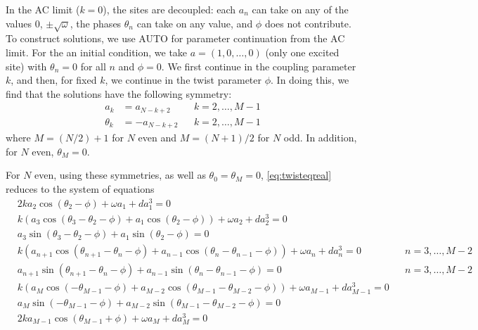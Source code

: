 \documentclass[12pt]{article}
\begin{document}
In the AC limit ($k = 0$), the sites are decoupled: each $a_n$ can take on any of the values 0, $\pm \sqrt{\omega}$, the phases $\theta_n$ can take on any value, and $\phi$ does not contribute. To construct solutions, we use AUTO for parameter continuation from the AC limit. For the an initial condition, we take $a = (1, 0, \dots, 0)$ (only one excited site) with $\theta_n = 0$ for all $n$ and $\phi = 0$. We first continue in the coupling parameter $k$, and then, for fixed $k$, we continue in the twist parameter $\phi$. In doing this, we find that the solutions have the following symmetry:
\begin{equation}
\begin{aligned}
a_k &= a_{N-k+2} && k = 2, \dots, M-1 \\
\theta_k &= -a_{N-k+2} && k = 2, \dots, M-1 
\end{aligned}
\end{equation}
where $M = (N/2)+1$ for $N$ even and $M = (N+1)/2$ for $N$ odd. In addition, for $N$ even, $\theta_M = 0$. 

For $N$ even, using these symmetries, as well as $\theta_0 = \theta_M = 0$, \cref{eq:twisteqreal} reduces to the system of equations
\begin{equation}\label{eq:twisteqeven}
\begin{aligned}
&2 k a_2 \cos(\theta_2 - \phi) + \omega a_1 + d a_1^3 = 0 \\
&k\left( a_3 \cos(\theta_3-\theta_2-\phi) + a_1 \cos(\theta_2-\phi)\right) + \omega a_2 + d a_2^3 = 0 \\
&a_3 \sin(\theta_3-\theta_2-\phi) + a_1 \sin(\theta_2-\phi) = 0 \\
&k\left( a_{n+1} \cos(\theta_{n+1}-\theta_n-\phi) + a_{n-1} \cos(\theta_n - \theta_{n-1}-\phi)\right) + \omega a_n + d a_n^3 = 0 && n = 3, \dots, M-2 \\
&a_{n+1} \sin(\theta_{n+1}-\theta_n-\phi) + a_{n-1} \sin(\theta_n - \theta_{n-1}-\phi) = 0 && n = 3, \dots, M-2 \\
&k\left( a_M \cos(-\theta_{M-1}-\phi) + a_{M-2} \cos(\theta_{M-1} - \theta_{M-2}-\phi)\right) + \omega a_{M-1} + d a_{M-1}^3 = 0 \\
&a_M \sin(-\theta_{M-1} -\phi) + a_{M-2} \sin(\theta_{M-1} - \theta_{M-2}-\phi) = 0 \\
&2 k a_{M-1} \cos(\theta_{M-1} + \phi) + \omega a_M + d a_M^3 = 0
\end{aligned}
\end{equation}
\end{document}
